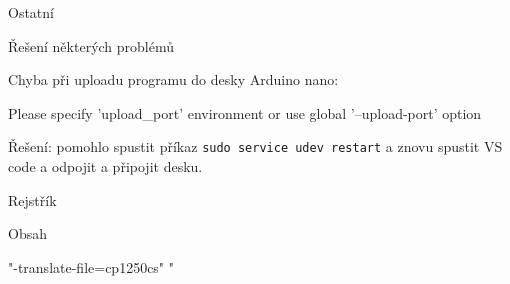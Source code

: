 \chyph %
\hyperlinks{\Blue}{\Green} %
\typosize[10/12] %
{} %

\draft %
\def\frac#1#2{{#1\over#2}} %








% 

 

\chap Ostatní


 
\sec Řešení některých problémů

\secc Chyba při uploadu programu do desky Arduino nano: 

\begtt Please specify 'upload_port' environment or use global '--upload-port' option \endtt

Řešení: pomohlo spustit příkaz {\tt sudo service udev restart} a znovu spustit VS code a odpojit a připojit desku.  



\vfil \break \nonum \sec Rejstřík 

\makeindex 
\endmulti

\vfil \break \nonum \sec Obsah %

\maketoc


\makerfc

\bye
 
  
"-translate-file=cp1250cs" "%

